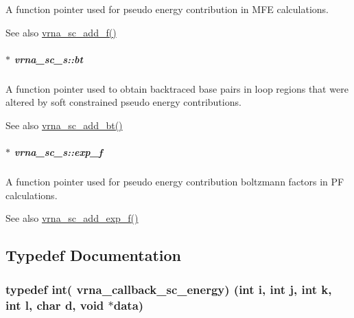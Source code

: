 A function pointer used for pseudo energy contribution in M\+FE calculations. 

\begin{DoxySeeAlso}{See also}
\hyperlink{group__soft__constraints_ga8c7d907ec0125cd61c04e0908010a4e9}{vrna\+\_\+sc\+\_\+add\+\_\+f()} 
\end{DoxySeeAlso}
\subparagraph[{\texorpdfstring{bt}{bt}}]{$\ast$ vrna\+\_\+sc\+\_\+s\+::bt}\hypertarget{group__soft__constraints_a2a2aca01782c2b980d7b7fd05b9be89c}{}\label{group__soft__constraints_a2a2aca01782c2b980d7b7fd05b9be89c}


A function pointer used to obtain backtraced base pairs in loop regions that were altered by soft constrained pseudo energy contributions. 

\begin{DoxySeeAlso}{See also}
\hyperlink{group__soft__constraints_gabde7d07a79bb9a8f4721aee247b674ea}{vrna\+\_\+sc\+\_\+add\+\_\+bt()} 
\end{DoxySeeAlso}
\subparagraph[{\texorpdfstring{exp\+\_\+f}{exp_f}}]{$\ast$ vrna\+\_\+sc\+\_\+s\+::exp\+\_\+f}\hypertarget{group__soft__constraints_a0de08a09f3ccf2f97974d23192668ab0}{}\label{group__soft__constraints_a0de08a09f3ccf2f97974d23192668ab0}


A function pointer used for pseudo energy contribution boltzmann factors in PF calculations. 

\begin{DoxySeeAlso}{See also}
\hyperlink{group__soft__constraints_ga87e382b5d0c9b7d9ce1b79c0473ff700}{vrna\+\_\+sc\+\_\+add\+\_\+exp\+\_\+f()} 
\end{DoxySeeAlso}


\subsection{Typedef Documentation}
\subsubsection[{\texorpdfstring{vrna\+\_\+callback\+\_\+sc\+\_\+energy}{vrna_callback_sc_energy}}]{\setlength{\rightskip}{0pt plus 5cm}typedef int( vrna\+\_\+callback\+\_\+sc\+\_\+energy) (int i, int j, int k, int l, char d, void $\ast$data)}\hypertarget{group__soft__constraints_gaf38062858ac25fd5e240c2c3b0b0b780}{}\label{group__soft__constraints_gaf38062858ac25fd5e240c2c3b0b0b780}


